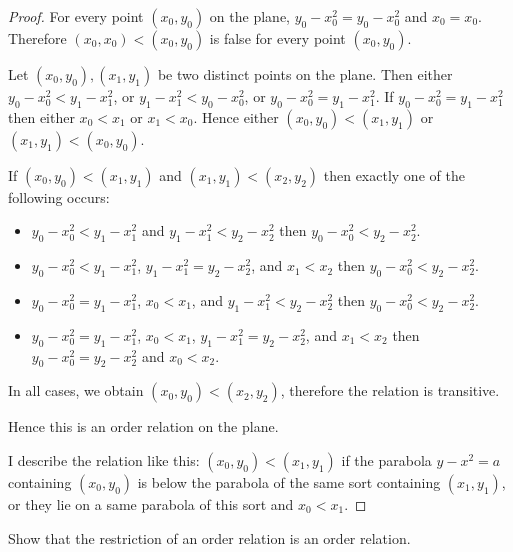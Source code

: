 \begin{proof}
    For every point $(x_{0}, y_{0})$ on the plane, $y_{0} - x_{0}^{2} = y_{0} - x_{0}^{2}$ and $x_{0} = x_{0}$. Therefore $(x_{0}, x_{0}) < (x_{0}, y_{0})$ is false for every point $(x_{0}, y_{0})$.

    Let $(x_{0}, y_{0}), (x_{1}, y_{1})$ be two distinct points on the plane. Then either $y_{0} - x_{0}^{2} < y_{1} - x_{1}^{2}$, or $y_{1} - x_{1}^{2} < y_{0} - x_{0}^{2}$, or $y_{0} - x_{0}^{2} = y_{1} - x_{1}^{2}$. If $y_{0} - x_{0}^{2} = y_{1} - x_{1}^{2}$ then either $x_{0} < x_{1}$ or $x_{1} < x_{0}$. Hence either $(x_{0}, y_{0}) < (x_{1}, y_{1})$ or $(x_{1}, y_{1}) < (x_{0}, y_{0})$.

    If $(x_{0}, y_{0}) < (x_{1}, y_{1})$ and $(x_{1}, y_{1}) < (x_{2}, y_{2})$ then exactly one of the following occurs:
    \begin{itemize}
        \item $y_{0} - x_{0}^{2} < y_{1} - x_{1}^{2}$ and $y_{1} - x_{1}^{2} < y_{2} - x_{2}^{2}$ then $y_{0} - x_{0}^{2} < y_{2} - x_{2}^{2}$.
        \item $y_{0} - x_{0}^{2} < y_{1} - x_{1}^{2}$, $y_{1} - x_{1}^{2} = y_{2} - x_{2}^{2}$, and $x_{1} < x_{2}$ then $y_{0} - x_{0}^{2} < y_{2} - x_{2}^{2}$.
        \item $y_{0} - x_{0}^{2} = y_{1} - x_{1}^{2}$, $x_{0} < x_{1}$, and $y_{1} - x_{1}^{2} < y_{2} - x_{2}^{2}$ then $y_{0} - x_{0}^{2} < y_{2} - x_{2}^{2}$.
        \item $y_{0} - x_{0}^{2} = y_{1} - x_{1}^{2}$, $x_{0} < x_{1}$, $y_{1} - x_{1}^{2} = y_{2} - x_{2}^{2}$, and $x_{1} < x_{2}$ then $y_{0} - x_{0}^{2} = y_{2} - x_{2}^{2}$ and $x_{0} < x_{2}$.
    \end{itemize}

    In all cases, we obtain $(x_{0}, y_{0}) < (x_{2}, y_{2})$, therefore the relation is transitive.

    Hence this is an order relation on the plane.

    I describe the relation like this: $(x_{0}, y_{0}) < (x_{1}, y_{1})$ if the parabola $y - x^{2} = a$ containing $(x_{0}, y_{0})$ is below the parabola of the same sort containing $(x_{1}, y_{1})$, or they lie on a same parabola of this sort and $x_{0} < x_{1}$.
\end{proof}

\begin{exercise}\label{chapter1:section3:exercise7}
    Show that the restriction of an order relation is an order relation.
\end{exercise}

